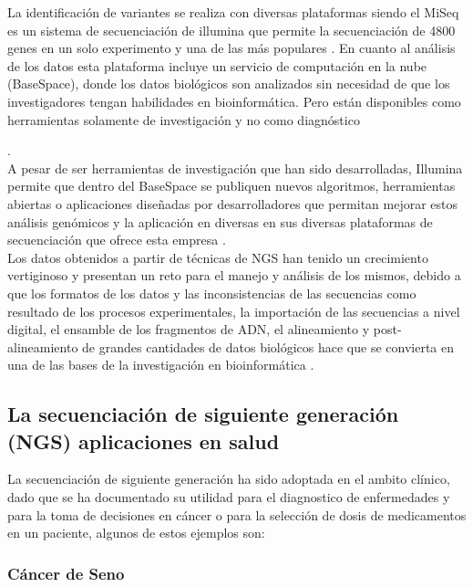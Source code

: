 La identificación de variantes se realiza con diversas plataformas siendo el MiSeq es un sistema de secuenciación de illumina que permite la secuenciación de 4800 genes en un solo experimento y una de las más populares \cite{Illumina2017}. En cuanto al análisis de los datos esta plataforma incluye un servicio de computación en la nube (BaseSpace), donde los datos biológicos son analizados  sin necesidad de que los investigadores tengan habilidades en bioinformática. Pero están disponibles como herramientas solamente de investigación y no como diagnóstico {\cite{Illumina2017}. \\

A pesar de ser herramientas de investigación  que han sido desarrolladas, Illumina permite que dentro del BaseSpace se publiquen nuevos algoritmos, herramientas abiertas o aplicaciones diseñadas por desarrolladores que permitan mejorar estos análisis genómicos y  la aplicación en diversas en sus diversas plataformas de secuenciación que ofrece esta empresa \cite{Illumina2017}. \\

Los datos obtenidos a partir de técnicas de NGS han tenido un crecimiento vertiginoso y presentan un reto para el manejo y análisis de los mismos, debido a que los formatos de los datos y las inconsistencias de las secuencias como resultado de los procesos experimentales, la importación de las secuencias a nivel digital, el ensamble de los fragmentos de ADN, el alineamiento y post-alineamiento de grandes cantidades de datos biológicos hace que se convierta en una de las bases de la investigación en bioinformática \cite{Deng2011,Triplet2014}.\\

\subsection*{La secuenciación de siguiente generación (NGS) aplicaciones en salud}

La secuenciación de siguiente generación ha sido adoptada en el ambito clínico, dado que se ha documentado su utilidad para el diagnostico de enfermedades  y para la toma de decisiones en cáncer o para la selección de dosis de medicamentos en un paciente, \cite{Lubin2017} algunos de estos ejemplos son:

\subsubsection*{Cáncer de Seno}

}
